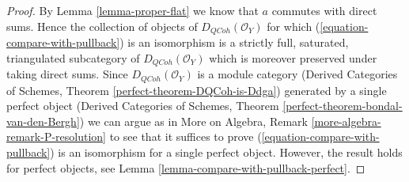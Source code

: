\documentclass[10pt,a4paper]{amsart}
\theoremstyle{plain}
\theoremstyle{definition}
\theoremstyle{remark}
\numberwithin{equation}{subsection}
\def\QCoh{\mathit{QCoh}}
\begin{document}
\begin{proof}
By Lemma \ref{lemma-proper-flat} we know that $a$ commutes
with direct sums. Hence the collection of objects of
$D_\QCoh(\mathcal{O}_Y)$ for which (\ref{equation-compare-with-pullback})
is an isomorphism is a strictly full, saturated, triangulated
subcategory of $D_\QCoh(\mathcal{O}_Y)$ which is moreover
preserved under taking direct sums. Since $D_\QCoh(\mathcal{O}_Y)$
is a module category (Derived Categories of Schemes, Theorem
\ref{perfect-theorem-DQCoh-is-Ddga}) generated by a single
perfect object (Derived Categories of Schemes, Theorem
\ref{perfect-theorem-bondal-van-den-Bergh})
we can argue as in
More on Algebra, Remark \ref{more-algebra-remark-P-resolution}
to see that it suffices to prove (\ref{equation-compare-with-pullback})
is an isomorphism for a single perfect object.
However, the result holds for perfect objects, see
Lemma \ref{lemma-compare-with-pullback-perfect}.
\end{proof}
\end{document}
